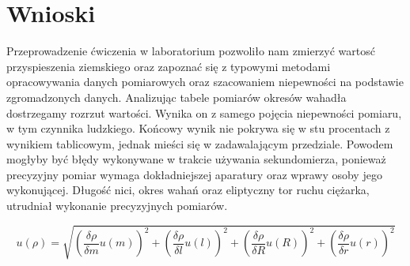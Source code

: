 \documentclass[a4paper,12pts]{article}
\begin{document}

	\section{Wnioski}
	Przeprowadzenie ćwiczenia w laboratorium pozwoliło nam zmierzyć wartosć przyspieszenia ziemskiego oraz zapoznać się z typowymi metodami opracowywania danych pomiarowych oraz szacowaniem niepewności na podstawie zgromadzonych danych. 
	Analizując tabele pomiarów okresów wahadła dostrzegamy rozrzut wartości. Wynika on z samego pojęcia niepewności pomiaru, w tym czynnika ludzkiego. Końcowy wynik nie pokrywa się w stu procentach z wynikiem tablicowym, jednak mieści się w zadawalającym przedziale. Powodem mogłyby być błędy wykonywane w trakcie używania sekundomierza, ponieważ precyzyjny pomiar wymaga dokładniejszej aparatury oraz wprawy osoby jego wykonującej. Długość nici, okres wahań oraz eliptyczny tor ruchu ciężarka, utrudniał wykonanie precyzyjnych pomiarów.
		\newpage
		
	\begin{equation}
		u(\rho) = \sqrt{\left( \frac{\delta \rho}{\delta m}u(m) \right)^2 + \left( \frac{\delta \rho}{\delta l}u(l) \right)^2 + \left( \frac{\delta \rho}{\delta R}u(R) \right)^2 + \left( \frac{\delta \rho}{\delta r}u(r) \right)^2}
	\end{equation}
\end{document}
